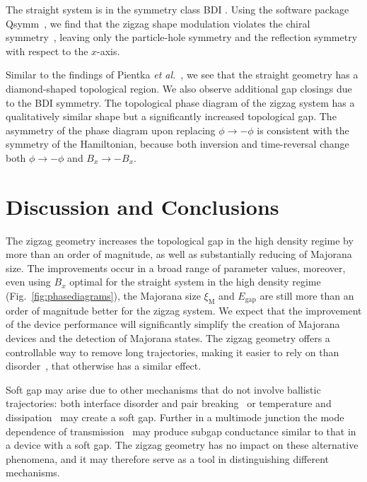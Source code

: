 \documentclass[english, twocolumn, 10pt, aps, superscriptaddress, floatfix, prb, citeautoscript]{revtex4-1}
\renewcommand{\comment}[2]{#2}
\begin{document}
\comment{The introduction of a the zigzag breaks a chiral symmetry, bringing the system from the BDI to the D symmetry class}
The straight system is in the symmetry class BDI \cite{Pientka2017}.
Using the software package Qsymm~\cite{Varjas2018}, we find that the zigzag shape modulation violates the chiral symmetry~\cite{Setiawan2019}, leaving only the particle-hole symmetry and the reflection symmetry with respect to the $x$-axis.

\comment{The phase diagram does not change much, except we see a cleaner spectrum as a result of the D class symmetry.}
Similar to the findings of Pientka \textit{et al.}~\cite{Pientka2017}, we see that the straight geometry has a diamond-shaped topological region.
We also observe additional gap closings due to the BDI symmetry.
The topological phase diagram of the zigzag system has a qualitatively similar shape but a significantly increased topological gap.
The asymmetry of the phase diagram upon replacing $\phi \rightarrow -\phi$ is consistent with the symmetry of the Hamiltonian, because both inversion and time-reversal change both $\phi \rightarrow -\phi$ and $B_x \rightarrow -B_x$.


\section{Discussion and Conclusions}

\comment{The zigzag geometry is a controllable tool in hardening the gap and decreasing Majorana size.}
The zigzag geometry increases the topological gap in the high density regime by more than an order of magnitude, as well as substantially reducing of Majorana size.
The improvements occur in a broad range of parameter values, moreover, even using $B_x$ optimal for the straight system in the high density regime (Fig.~\ref{fig:phasediagrams}), the Majorana size $\xi_\textrm{M}$ and $E_\textrm{gap}$ are still more than an order of magnitude better for the zigzag system.
We expect that the improvement of the device performance will significantly simplify the creation of Majorana devices and the detection of Majorana states.
The zigzag geometry offers a controllable way to remove long trajectories, making it easier to rely on than disorder~\cite{Haim2018}, that otherwise has a similar effect.

\comment{Zigzag doesn't do anything against other mechanisms, and therefore it doesn't help to use it ignorantly}
Soft gap may arise due to other mechanisms that do not involve ballistic trajectories: both interface disorder and pair breaking~\cite{Takei2013} or temperature and dissipation~\cite{Liu2017} may create a soft gap.
Further in a multimode junction the mode dependence of transmission~\cite{Stanescu2014} may produce subgap conductance similar to that in a device with a soft gap.
The zigzag geometry has no impact on these alternative phenomena, and it may therefore serve as a tool in distinguishing different mechanisms.
\end{document}
